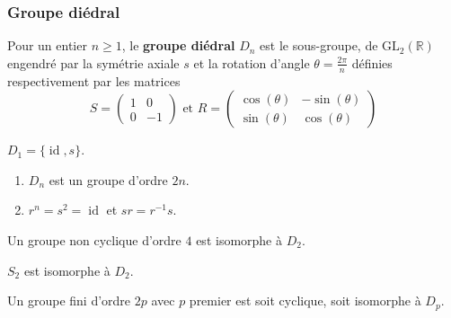   \subsubsection{Groupe diédral}


  \begin{definition}
    Pour un entier $n \geq 1$, le \textbf{groupe diédral} $D_n$ est le sous-groupe, de $\mathrm{GL}_2(\mathbb{R})$ engendré par la symétrie axiale $s$ et la rotation d'angle $\theta = \frac{2\pi}{n}$ définies respectivement par les matrices
    \[
    S =
    \begin{pmatrix}
      1 & 0 \\
      0 & -1
    \end{pmatrix}
    \text{ et }
    R =
    \begin{pmatrix}
      \cos(\theta) & -\sin(\theta) \\
      \sin(\theta) & \cos(\theta)
    \end{pmatrix}
    \]
  \end{definition}

  \begin{example}
    $D_1 = \{ \operatorname{id}, s \}$.
  \end{example}

  \begin{proposition}
    \begin{enumerate}[label={\bfseries(\roman*)}]
      \item $D_n$ est un groupe d'ordre $2n$.
      \item $r^n = s^2 = \operatorname{id}$ et $sr = r^{-1}s$.
    \end{enumerate}
  \end{proposition}


  \begin{proposition}
    Un groupe non cyclique d'ordre $4$ est isomorphe à $D_2$.
  \end{proposition}


  \begin{example}
    $S_2$ est isomorphe à $D_2$.
  \end{example}


  \begin{proposition}
    Un groupe fini d'ordre $2p$ avec $p$ premier est soit cyclique, soit isomorphe à $D_p$.
  \end{proposition}

